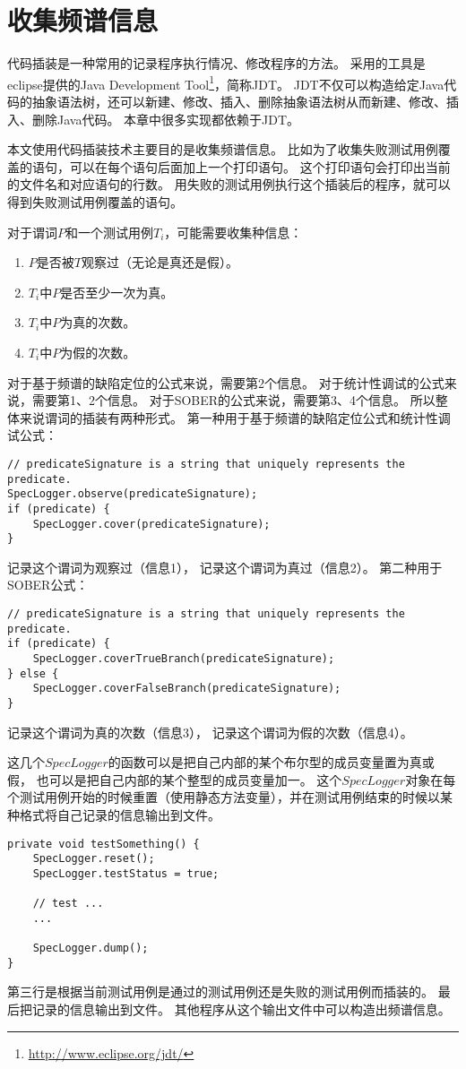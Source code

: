 \section{收集频谱信息}

代码插装是一种常用的记录程序执行情况、修改程序的方法。
采用的工具是eclipse提供的Java Development Tool\footnote{\url{http://www.eclipse.org/jdt/}}，简称JDT。
JDT不仅可以构造给定Java代码的抽象语法树，还可以新建、修改、插入、删除抽象语法树从而新建、修改、插入、删除Java代码。
本章中很多实现都依赖于JDT。

本文使用代码插装技术主要目的是收集频谱信息。
比如为了收集失败测试用例覆盖的语句，可以在每个语句后面加上一个打印语句。
这个打印语句会打印出当前的文件名和对应语句的行数。
用失败的测试用例执行这个插装后的程序，就可以得到失败测试用例覆盖的语句。

对于谓词$P$和一个测试用例$T_i$，可能需要收集种信息：
\begin{enumerate}
\item $P$是否被$T$观察过（无论是真还是假）。
\item $T_i$中$P$是否至少一次为真。
\item $T_i$中$P$为真的次数。
\item $T_i$中$P$为假的次数。
\end{enumerate}

对于基于频谱的缺陷定位的公式来说，需要第2个信息。
对于统计性调试的公式来说，需要第1、2个信息。
对于SOBER的公式来说，需要第3、4个信息。
所以整体来说谓词的插装有两种形式。
第一种用于基于频谱的缺陷定位公式和统计性调试公式：
\lstset{language=Java}
\begin{lstlisting}
// predicateSignature is a string that uniquely represents the predicate.
SpecLogger.observe(predicateSignature);
if (predicate) {
    SpecLogger.cover(predicateSignature);
}
\end{lstlisting}
记录这个谓词为观察过（信息1），
记录这个谓词为真过（信息2）。
第二种用于SOBER公式：
\lstset{language=Java}
\begin{lstlisting}
// predicateSignature is a string that uniquely represents the predicate.
if (predicate) {
    SpecLogger.coverTrueBranch(predicateSignature);
} else {
    SpecLogger.coverFalseBranch(predicateSignature);
}
\end{lstlisting}
记录这个谓词为真的次数（信息3），
记录这个谓词为假的次数（信息4）。

这几个$SpecLogger$的函数可以是把自己内部的某个布尔型的成员变量置为真或假，
也可以是把自己内部的某个整型的成员变量加一。
这个$SpecLogger$对象在每个测试用例开始的时候重置（使用静态方法变量），并在测试用例结束的时候以某种格式将自己记录的信息输出到文件。
\lstset{language=Java}
\begin{lstlisting}
private void testSomething() {
	SpecLogger.reset();
    SpecLogger.testStatus = true;

    // test ...
    ...

    SpecLogger.dump();
}
\end{lstlisting}
第三行是根据当前测试用例是通过的测试用例还是失败的测试用例而插装的。
最后把记录的信息输出到文件。
其他程序从这个输出文件中可以构造出频谱信息。

